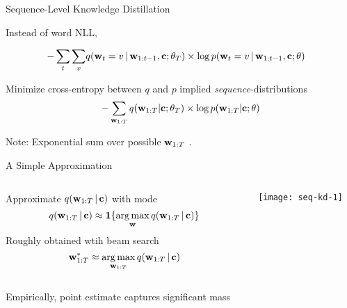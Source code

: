 
\begin{frame}{Sequence-Level Knowledge Distillation}
\air 
\air
\air  

Instead of word NLL, 

\begin{align*}
-\sum_t \sum_v &q(\mathbf{w}_t=v \,|\, \mathbf{w}_{1: t-1}, \mathbf{c} ; \theta_T)\times  \log p(\mathbf{w}_t =v \,|\, \mathbf{w}_{1: t-1}, \mathbf{c} ; \theta)
\end{align*}
 

Minimize cross-entropy between $q$ and $p$ implied \emph{sequence}-distributions 
\[
 -\sum_{\mathbf{w}_{1:T}} q(\mathbf{w}_{1:T} | \mathbf{c}; \theta_T) \times \log p(\mathbf{w}_{1:T} | \mathbf{c} ; \theta)
\]
\air

Note: Exponential sum over possible $\mathbf{w}_{1:T}$ . \\ 
\air
\air

\end{frame}

\begin{frame}{A Simple Approximation}
\air 
\air

\begin{columns}
\begin{column}{6cm}
Approximate $q(\mathbf{w}_{1:T} \,|\, \mathbf{c} )$ with mode
$$q(\wvec_{1:T} \given \cvec ) \approx \mathbf{1}\{\argmax_{\wvec} q(\wvec_{1:T} \given \cvec )\}$$
\air
Roughly obtained wtih  beam search 
$$ \wvec^*_{1:T} \approx  \argmax_{\wvec_{1:T}} q(\wvec_{1:T} \given \cvec ) $$
\\
Empirically, point estimate captures 
significant mass

\end{column}
\begin{column}{6cm}
\texttt{[image: seq-kd-1]}
\end{column}
\end{columns}
\end{frame}


